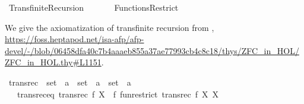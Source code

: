 %
\begin{isabellebody}%
%
%
\isadelimdocument
%
\endisadelimdocument
%
\isatagdocument
\isanewline
%
\isamarkuptrue%
%
\endisatagdocument
{\isafolddocument}%
%
\isadelimdocument
%
\endisadelimdocument
%
\isadelimtheory
%
\endisadelimtheory
%
\isatagtheory
{}\isamarkupfalse%
\ Transfinite{\isacharunderscore}{\kern0pt}Recursion\isanewline
\ \ \isanewline
\ \ \ \ Functions{\isacharunderscore}{\kern0pt}Restrict\isanewline
{}%
\endisatagtheory
{\isafoldtheory}%
%
\isadelimtheory
%
\endisadelimtheory
%
\isadelimdocument
%
\endisadelimdocument
%
\isatagdocument
%
\isamarkuptrue%
%
\endisatagdocument
{\isafolddocument}%
%
\isadelimdocument
%
\endisadelimdocument
%
\begin{isamarkuptext}%
We give the axiomatization of transfinite recursion from \cite{ZFC_in_HOL_AFP},
\url{https://foss.heptapod.net/isa-afp/afp-devel/-/blob/06458dfa40c7b4aaaeb855a37ae77993cb4c8c18/thys/ZFC_in_HOL/ZFC_in_HOL.thy\#L1151}.%
\end{isamarkuptext}\isamarkuptrue%
\isamarkupfalse%
\ transrec\ {\isacharcolon}{\kern0pt}{\isacharcolon}{\kern0pt}\ {\isachardoublequoteopen}{\isacharparenleft}{\kern0pt}{\isacharparenleft}{\kern0pt}set\ {\isasymRightarrow}\ {\isacharprime}{\kern0pt}a{\isacharparenright}{\kern0pt}\ {\isasymRightarrow}\ set\ {\isasymRightarrow}\ {\isacharprime}{\kern0pt}a{\isacharparenright}{\kern0pt}\ {\isasymRightarrow}\ set\ {\isasymRightarrow}\ {\isacharprime}{\kern0pt}a{\isachardoublequoteclose}\isanewline
\ \ \ transrec{\isacharunderscore}{\kern0pt}eq{\isacharcolon}{\kern0pt}\ {\isachardoublequoteopen}transrec\ f\ X\ {\isacharequal}{\kern0pt}\ f\ {\isacharparenleft}{\kern0pt}fun{\isacharunderscore}{\kern0pt}restrict\ {\isacharparenleft}{\kern0pt}transrec\ f{\isacharparenright}{\kern0pt}\ X{\isacharparenright}{\kern0pt}\ X{\isachardoublequoteclose}\isanewline
%
\isadelimtheory
\isanewline
%
\endisadelimtheory
%
\isatagtheory
{}\isamarkupfalse%
%
\endisatagtheory
{\isafoldtheory}%
%
\isadelimtheory
%
\endisadelimtheory
%
\end{isabellebody}%
\endinput
